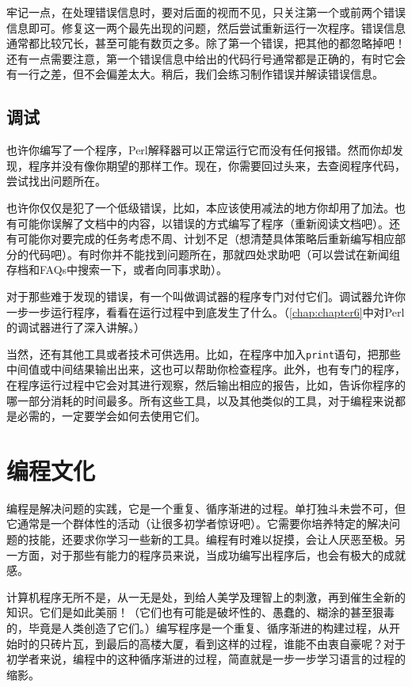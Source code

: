 牢记一点，在处理错误信息时，要对后面的视而不见，只关注第一个或前两个错误信息即可。修复这一两个最先出现的问题，然后尝试重新运行一次程序。错误信息通常都比较冗长，甚至可能有数页之多。除了第一个错误，把其他的都忽略掉吧！还有一点需要注意，第一个错误信息中给出的代码行号通常都是正确的，有时它会有一行之差，但不会偏差太大。稍后，我们会练习制作错误并解读错误信息。

\subsection{调试}
也许你编写了一个程序，Perl解释器可以正常运行它而没有任何报错。然而你却发现，程序并没有像你期望的那样工作。现在，你需要回过头来，去查阅程序代码，尝试找出问题所在。

也许你仅仅是犯了一个低级错误，比如，本应该使用减法的地方你却用了加法。也有可能你误解了文档中的内容，以错误的方式编写了程序（重新阅读文档吧）。还有可能你对要完成的任务考虑不周、计划不足（想清楚具体策略后重新编写相应部分的代码吧）。有时你并不能找到问题所在，那就四处求助吧（可以尝试在新闻组存档和FAQs中搜索一下，或者向同事求助）。

对于那些难于发现的错误，有一个叫做调试器的程序专门对付它们。调试器允许你一步一步运行程序，看看在运行过程中到底发生了什么。（\ref{chap:chapter6}中对Perl的调试器进行了深入讲解。）

当然，还有其他工具或者技术可供选用。比如，在程序中加入\verb|print|语句，把那些中间值或中间结果输出出来，这也可以帮助你检查程序。此外，也有专门的程序，在程序运行过程中它会对其进行观察，然后输出相应的报告，比如，告诉你程序的哪一部分消耗的时间最多。所有这些工具，以及其他类似的工具，对于编程来说都是必需的，一定要学会如何去使用它们。

\section{编程文化}
编程是解决问题的实践，它是一个重复、循序渐进的过程。单打独斗未尝不可，但它通常是一个群体性的活动（让很多初学者惊讶吧）。它需要你培养特定的解决问题的技能，还要求你学习一些新的工具。编程有时难以捉摸，会让人厌恶至极。另一方面，对于那些有能力的程序员来说，当成功编写出程序后，也会有极大的成就感。

计算机程序无所不是，从一无是处，到给人美学及理智上的刺激，再到催生全新的知识。它们是如此美丽！（它们也有可能是破坏性的、愚蠢的、糊涂的甚至狠毒的，毕竟是人类创造了它们。）编写程序是一个重复、循序渐进的构建过程，从开始时的只砖片瓦，到最后的高楼大厦，看到这样的过程，谁能不由衷自豪呢？对于初学者来说，编程中的这种循序渐进的过程，简直就是一步一步学习语言的过程的缩影。

